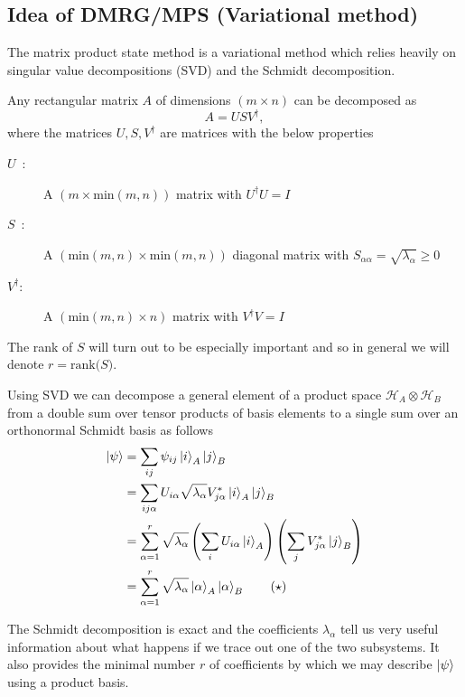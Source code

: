 \documentclass[a4paper]{article}
\begin{document}
\subsection{Idea of DMRG/MPS (Variational method)}
The matrix product state method is a variational method which relies heavily on
singular value decompositions (SVD) and the Schmidt decomposition.
\begin{method}
    Any rectangular matrix $A$ of dimensions $(m\times n)$ can be decomposed as 
\[
A=USV^\dagger,
\]
where the matrices $U,S,V^\dagger$ are matrices with the below properties
\begin{description}
    \item[$U\,\,\,$:] A $\left(m\times\mathrm{min}(m,n)\right)$ matrix with $U^\dagger U=I$
    \item[$S\,\,\,$:] A $\left(\mathrm{min}(m,n)\times\mathrm{min}(m,n)\right)$ diagonal matrix with
            $S_{\alpha\alpha}=\sqrt{\lambda_\alpha}\geq0$
    \item[$V^\dagger$:] A $\left(\mathrm{min}(m,n)\times n\right)$ matrix with $V^\dagger V=I$
\end{description}
The rank of $S$ will turn out to be especially important and so in general we
will denote $r=\text{rank($S$)}$.
\end{method}
\begin{method}
    Using SVD we can decompose a general element of a product space
    $\mathcal{H}_A\otimes \mathcal{H}_B$ from a double sum over tensor products
    of basis elements to a single sum over an orthonormal Schmidt basis as follows
\begin{align*}
\ket{\psi}&=\sum_{ij}\psi_{ij}\ket{i}_A\ket{j}_B\\
&= \sum_{ij\alpha}U_{i\alpha}\sqrt{\lambda_\alpha} V_{j\alpha}^*\ket{i}_A\ket{j}_B\\
&=\sum_{\alpha=1}^r \sqrt{\lambda_\alpha}\left(\sum_i U_{i\alpha}\ket{i}_A\right)\left(\sum_j
V_{j\alpha}^* \ket{j}_B\right)\\
&=\sum_{\alpha=1}^{r}\sqrt{\lambda_\alpha}\ket{\alpha}_A\ket{\alpha}_B\tag{$\star$}\label{eq:schmidtdecomp}
\end{align*}
\end{method}
The Schmidt decomposition is exact and the coefficients $\lambda_\alpha$ tell us very useful
information about what happens if we trace out one of the two subsystems. It
also provides the minimal number $r$ of coefficients by which we may describe
$\ket{\psi}$ using a product basis. 
\end{document}
